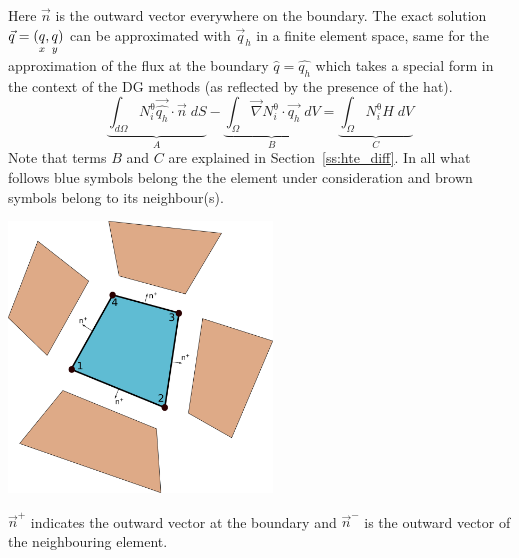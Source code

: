 Here $\vec{n}$ is the outward vector everywhere on the boundary. 
The exact solution $\vec{q}=(\underset{\tiny x}{q},\underset{\tiny y}{q})$ can be approximated with $\vec{q}_h$ in a  finite element space, same for the approximation of the flux at the boundary $\hat{q}=\hat{q_h}$ which takes a special form in the context of the DG methods (as reflected by the presence of the hat).
\begin{equation}
\underbrace{ \int_{d\Omega}{N^\uptheta_i} \vec{\hat{q_h}} \cdot \vec{n} \; dS}_{A } - 
\underbrace{ \int_{\Omega} \vec{\nabla} {N^\uptheta_i} \cdot \vec{q_h} \; dV}_{B} = 
\underbrace{\int_{\Omega} {N^\uptheta_i} H  \;dV }_C
\label{eq:q2dss}
\end{equation}
Note that terms $B$ and $C$ are explained in Section~\ref{ss:hte_diff}.
In all what follows blue symbols belong the the element under consideration 
and brown symbols belong to its neighbour(s).

\begin{center}
\includegraphics[width=7cm]{images/dgfem/dgelts}
\end{center}

$\vec{n}^+$ indicates the outward vector at the boundary and $\vec{n}^-$ is 
the outward vector of the neighbouring element.

